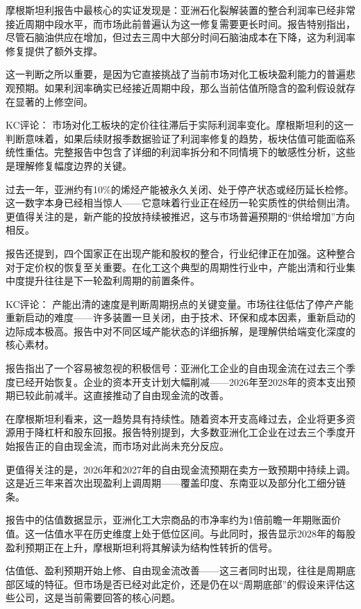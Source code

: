 \documentclass[11pt]{ctexart}
\begin{document}
摩根斯坦利报告中最核心的实证发现是：亚洲石化裂解装置的整合利润率已经非常接近周期中段水平，而市场此前普遍认为这一修复需要更长时间。报告特别指出，尽管石脑油供应在增加，但过去三周中大部分时间石脑油成本在下降，这为利润率修复提供了额外支撑。

这一判断之所以重要，是因为它直接挑战了当前市场对化工板块盈利能力的普遍悲观预期。如果利润率确实已经接近周期中段，那么当前估值所隐含的盈利假设就存在显著的上修空间。

KC评论： 市场对化工板块的定价往往滞后于实际利润率变化。摩根斯坦利的这一判断意味着，如果后续财报季数据验证了利润率修复的趋势，板块估值可能面临系统性重估。完整报告中包含了详细的利润率拆分和不同情境下的敏感性分析，这些是理解修复幅度边界的关键。

过去一年，亚洲约有10\%的烯烃产能被永久关闭、处于停产状态或经历延长检修。这一数字本身已经相当惊人——它意味着行业正在经历一轮实质性的供给侧出清。更值得关注的是，新产能的投放持续被推迟，这与市场普遍预期的“供给增加”方向相反。

报告还提到，四个国家正在出现产能和股权的整合，行业纪律正在加强。这种整合对于定价权的恢复至关重要。在化工这个典型的周期性行业中，产能出清和行业集中度提升往往是下一轮盈利周期的前置条件。

KC评论： 产能出清的速度是判断周期拐点的关键变量。市场往往低估了停产产能重新启动的难度——许多装置一旦关闭，由于技术、环保和成本因素，重新启动的边际成本极高。报告中对不同区域产能状态的详细拆解，是理解供给端变化深度的核心素材。

报告指出了一个容易被忽视的积极信号：亚洲化工企业的自由现金流在过去三个季度已经开始恢复。企业的资本开支计划大幅削减——2026年至2028年的资本支出预期已较此前减半。这直接推动了自由现金流的改善。

在摩根斯坦利看来，这一趋势具有持续性。随着资本开支高峰过去，企业将更多资源用于降杠杆和股东回报。报告特别提到，大多数亚洲化工企业在过去三个季度开始报告正的自由现金流，而市场对此尚未充分反应。

更值得关注的是，2026年和2027年的自由现金流预期在卖方一致预期中持续上调。这是近三年来首次出现盈利上调周期——覆盖印度、东南亚以及部分化工细分链条。

报告中的估值数据显示，亚洲化工大宗商品的市净率约为1倍前瞻一年期账面价值。这一估值水平在历史维度上处于低位区间。与此同时，报告显示2028年的每股盈利预期正在上升，摩根斯坦利将其解读为结构性转折的信号。

估值低、盈利预期开始上修、自由现金流改善——这三者同时出现，往往是周期底部区域的特征。但市场是否已经对此定价，还是仍在以“周期底部”的假设来评估这些公司，这是当前需要回答的核心问题。
\end{document}
